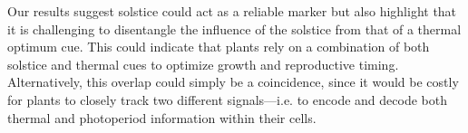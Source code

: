 \documentclass[11pt,letter]{article}
\begin{document}
Our results suggest solstice could act as a reliable marker but also highlight that it is challenging to disentangle the influence of the solstice from that of a thermal optimum cue. %
This could indicate that plants rely on a combination of both solstice and thermal cues to optimize growth and reproductive timing. 
Alternatively, this overlap could simply be a coincidence, since it would be costly for plants to closely track two different signals---i.e. to encode and decode both thermal and photoperiod information within their cells. 
\end{document}
